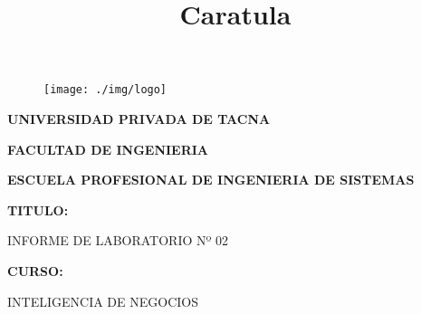 \documentclass[12pt,letterpaper]{article}
\begin{document}
%


\title{Caratula}

\begin{titlepage}
\begin{center}
\begin{figure}[htb]
\begin{center}
\texttt{[image: ./img/logo]}
\end{center}
\end{figure}

\vspace*{0.15in}
\begin{Large}
\textbf{UNIVERSIDAD PRIVADA DE TACNA}\\
\end{Large}

\vspace*{0.1in}
\begin{Large}
\textbf{FACULTAD DE INGENIERIA} \\
\end{Large}

\vspace*{0.1in}
\begin{Large}
\textbf{ESCUELA PROFESIONAL DE INGENIERIA DE SISTEMAS} \\
\end{Large}

\vspace*{0.5in}
\begin{Large}
\textbf{TITULO:}\\
\end{Large}

\vspace*{0.1in}
\begin{Large}
INFORME DE LABORATORIO Nº 02\\
\end{Large}

\vspace*{0.3in}
\begin{Large}
\textbf{CURSO:} \\
\end{Large}

\vspace*{0.1in}
\begin{large}
INTELIGENCIA DE NEGOCIOS\\
\end{large}


\end{center}
\end{titlepage}
\end{document}

